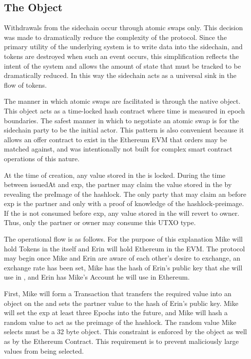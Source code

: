 \subsection{The \AtomicSwap{} Object}



Withdrawals from the sidechain occur through atomic swaps only.
This decision was made to dramatically reduce the complexity of the
protocol.
Since the primary utility of the underlying system is to write data
into the sidechain, and tokens are destroyed when such an event occurs,
this simplification reflects the intent of the system and allows the
amount of state that must be tracked to be dramatically reduced.
In this way the sidechain acts as a universal sink in the flow of
tokens.

The manner in which atomic swaps are facilitated is through the native
\AtomicSwap{} object.
This object acts as a time-locked hash contract where time is measured
in epoch boundaries.
The safest manner in which to negotiate an atomic swap is for the
sidechain party to be the initial actor.
This pattern is also convenient because it allows an offer contract to
exist in the Ethereum EVM that orders may be matched against, and
\LayerTwo{} was intentionally not built for complex smart contract
operations of this nature.

At the time of creation, any value stored in the \AtomicSwap{} is locked.
During the time between issuedAt and exp, the partner may claim the
value stored in the \AtomicSwap{} by revealing the preImage of the
hashlock.
The only party that may claim an \AtomicSwap{} before exp is the partner
and only with a proof of knowledge of the hashlock-preimage.
If the \AtomicSwap{} is not consumed before exp, any value stored in the
\AtomicSwap{} will revert to owner.
Thus, only the partner or owner may consume this UTXO type.

The operational flow is as follows.
For the purpose of this explanation Mike will hold \LayerTwo{} Tokens in
the \LayerTwo{} itself and Erin will hold Ethereum in the EVM.
The protocol may begin once Mike and Erin are aware of each other's
desire to exchange, an exchange rate has been set, Mike has the hash of
Erin's public key that she will use in \LayerTwo{}, and Erin has
Mike's Account he will use in Ethereum.

First, Mike will form a Transaction that transfers the required value
into an \AtomicSwap{} object on the \LayerTwo{} and sets the partner value
to the hash of Erin's public key.
Mike will set the exp at least three Epochs into the future, and Mike
will hash a random value to act as the preimage of the hashlock.
The random value Mike selects must be a 32 byte object.
This constraint is enforced by the \LayerTwo{} \AtomicSwap{} object as well
as by the Ethereum \AtomicSwap{}Contract.
This requirement is to prevent maliciously large values from being
selected.

